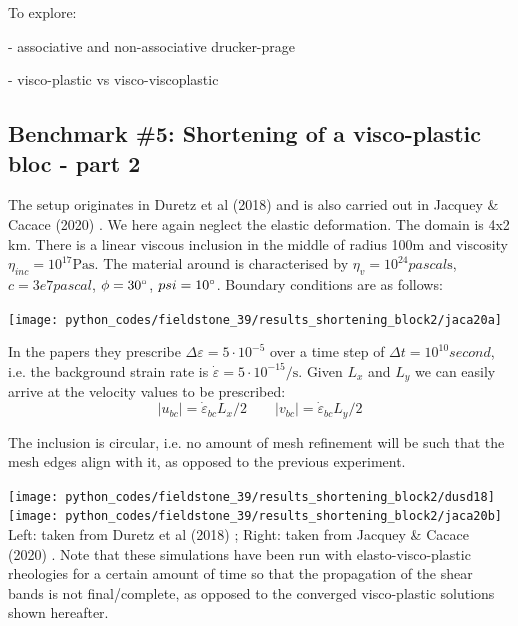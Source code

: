 \newpage
To explore:

- associative and non-associative drucker-prage

- visco-plastic vs visco-viscoplastic







\newpage
\subsection*{Benchmark \#5: Shortening of a visco-plastic bloc - part 2}

The setup originates in Duretz et al (2018) \cite{dusd18} and is also carried out 
in Jacquey \& Cacace (2020) \cite{jaca20a}. We here again neglect the elastic 
deformation. 
The domain is 4x2 km. There is a linear viscous inclusion in the middle of radius 100\si{\metre} and 
viscosity $\eta_{inc}=10^{17}\si{\pascal\second}$. The material around is characterised by 
$\eta_v=10^{24}\si{pascal\second}$, $c=3e7\si{pascal}$, $\phi=30\degree$, $psi=10\degree$.
Boundary conditions are as follows: 

\begin{center}
\texttt{[image: python\_codes/fieldstone\_39/results\_shortening\_block2/jaca20a]}
\end{center}

In the papers they prescribe $\Delta \varepsilon = 5\cdot 10^{-5}$ over a 
time step of $\Delta t=10^{10}\si{second}$, 
i.e. the background strain rate is $\dot\varepsilon=5\cdot 10^{-15}\si{\per\second}$.
Given $L_x$ and $L_y$ we can easily arrive at the velocity values to be prescribed:
\[
|u_{bc}|=\dot{\varepsilon}_{bc} L_x/2
\qquad
|v_{bc}|=\dot{\varepsilon}_{bc} L_y/2
\]
 
The inclusion is circular, i.e. no amount of mesh refinement will be such that the mesh 
edges align with it, as opposed to the previous experiment. 


\begin{center}
\texttt{[image: python\_codes/fieldstone\_39/results\_shortening\_block2/dusd18]}
\texttt{[image: python\_codes/fieldstone\_39/results\_shortening\_block2/jaca20b]}\\
{\captionfont Left: taken from Duretz et al (2018) \cite{dusd18}; Right: taken from Jacquey \& Cacace (2020) \cite{jaca20a}.
Note that these simulations have been run with elasto-visco-plastic rheologies 
for a certain amount of time so that the propagation of the shear bands is not final/complete, as
opposed to the converged visco-plastic solutions shown hereafter.}
\end{center}

